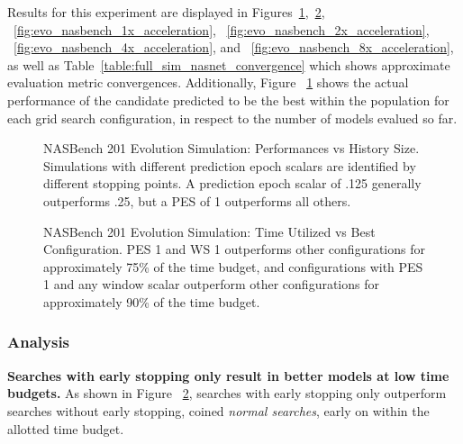 \documentclass[twocolumn]{article}
\begin{document}
Results for this experiment are displayed in Figures~\ref{fig:nasbench_best_perf_vs_size},~\ref{fig:nasbench_best_perf_vs_slice},
~\ref{fig:evo_nasbench_1x_acceleration},
~\ref{fig:evo_nasbench_2x_acceleration},
~\ref{fig:evo_nasbench_4x_acceleration},
and ~\ref{fig:evo_nasbench_8x_acceleration},
as well as Table~\ref{table:full_sim_nasnet_convergence} which shows approximate evaluation metric convergences.
Additionally, Figure ~\ref{fig:nasbench_best_perf_vs_size} shows the actual performance of the candidate predicted to be the best within the population for each grid search configuration,
in respect to the number of models evalued so far.

\begin{figure}[!ht]
    \begin{center}
        \resizebox{\columnwidth}{!}{
            
        }
        \caption{NASBench 201 Evolution Simulation: Performances vs History Size.
        Simulations with different prediction epoch scalars are identified by different stopping points.
        A prediction epoch scalar of .125 generally outperforms .25, but a PES of 1 outperforms all others.}
        \label{fig:nasbench_best_perf_vs_size}
    \end{center}
\end{figure}

\begin{figure}[!ht]
    \begin{center}
        \resizebox{\columnwidth}{!}{
            
        }
        \caption{NASBench 201 Evolution Simulation: Time Utilized vs Best Configuration. 
        PES 1 and WS 1 outperforms other configurations for approximately 75\% of the time budget, 
        and configurations with PES 1 and any window scalar outperform other configurations for approximately 90\% of the time budget.}
        \label{fig:nasbench_best_perf_vs_slice}
    \end{center}
\end{figure}


\subsubsection{Analysis}

\textbf{Searches with early stopping only result in better models at low time budgets.}
As shown in Figure ~\ref{fig:nasbench_best_perf_vs_slice}, searches with early stopping only outperform searches without early stopping, coined \emph{normal searches},
early on within the allotted time budget.
\end{document}
